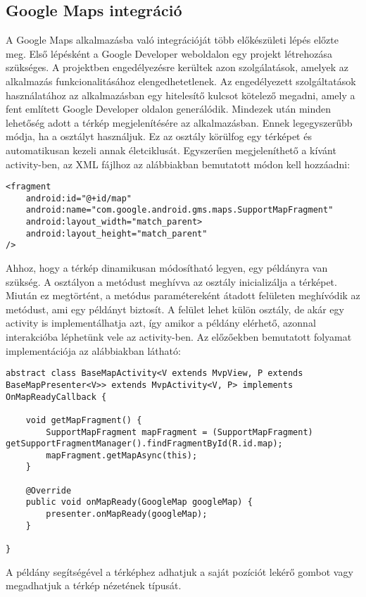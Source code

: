 \subsection*{Google Maps integráció}
\label{googlemaps}
A Google Maps alkalmazásba való integrációját több előkészületi lépés előzte meg.
Első lépésként a Google Developer weboldalon egy projekt létrehozása szükséges.
A projektben engedélyezésre kerültek azon szolgálatások, amelyek az alkalmazás funkcionalitásához elengedhetetlenek.
Az engedélyezett szolgáltatások használatához az alkalmazásban egy hitelesítő kulcsot kötelező megadni, amely a fent említett Google Developer oldalon generálódik. 
Mindezek után minden lehetőség adott a térkép megjelenítésére az alkalmazásban.
Ennek legegyszerűbb módja, ha a  osztályt használjuk.
Ez az osztály körülfog egy térképet és automatikusan kezeli annak életciklusát.
Egyszerűen megjeleníthető a kívánt activity-ben, az XML fájlhoz az alábbiakban bemutatott módon kell hozzáadni:
\begin{lstlisting}
<fragment
	android:id="@+id/map"
	android:name="com.google.android.gms.maps.SupportMapFragment"
	android:layout_width="match_parent>
	android:layout_height="match_parent"
/>
\end{lstlisting}

Ahhoz, hogy a térkép dinamikusan módosítható legyen, egy  példányra van szükség.
A  osztályon a  metódust meghívva az osztály inicializálja a térképet.
Miután ez megtörtént, a metódus paramétereként átadott  felületen meghívódik az  metódust, ami egy  példányt biztosít.
A  felület lehet külön osztály, de akár egy activity is implementálhatja azt, így amikor a példány elérhető, azonnal interakcióba léphetünk vele az activity-ben.
Az előzőekben bemutatott folyamat implementációja az alábbiakban látható:
\begin{lstlisting}
abstract class BaseMapActivity<V extends MvpView, P extends BaseMapPresenter<V>> extends MvpActivity<V, P> implements OnMapReadyCallback {

    void getMapFragment() {
        SupportMapFragment mapFragment = (SupportMapFragment) getSupportFragmentManager().findFragmentById(R.id.map);
        mapFragment.getMapAsync(this);
    }

    @Override
    public void onMapReady(GoogleMap googleMap) {
        presenter.onMapReady(googleMap);
    }

}
\end{lstlisting}
A  példány segítségével a térképhez adhatjuk a saját pozíciót lekérő gombot vagy megadhatjuk a térkép nézetének típusát.

